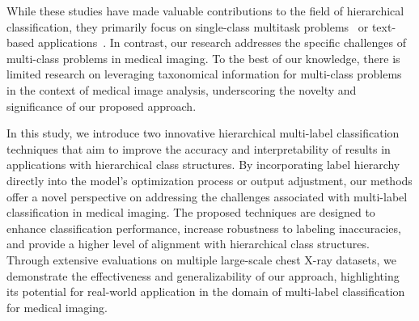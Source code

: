 \documentclass[review,1p,times,numbers]{elsarticle}
\begin{document}
While these studies have made valuable contributions to the field of hierarchical classification, they primarily focus on single-class multitask problems~\cite{bjerge_hierarchical_2023} or text-based applications~\cite{aly_Hierarchical_2019;rana_weakly_2023}. In contrast, our research addresses the specific challenges of multi-class problems in medical imaging. To the best of our knowledge, there is limited research on leveraging taxonomical information for multi-class problems in the context of medical image analysis, underscoring the novelty and significance of our proposed approach.

In this study, we introduce two innovative hierarchical multi-label classification techniques that aim to improve the accuracy and interpretability of results in applications with hierarchical class structures. By incorporating label hierarchy directly into the model's optimization process or output adjustment, our methods offer a novel perspective on addressing the challenges associated with multi-label classification in medical imaging. The proposed techniques are designed to enhance classification performance, increase robustness to labeling inaccuracies, and provide a higher level of alignment with hierarchical class structures. Through extensive evaluations on multiple large-scale chest X-ray datasets, we demonstrate the effectiveness and generalizability of our approach, highlighting its potential for real-world application in the domain of multi-label classification for medical imaging.
\end{document}

